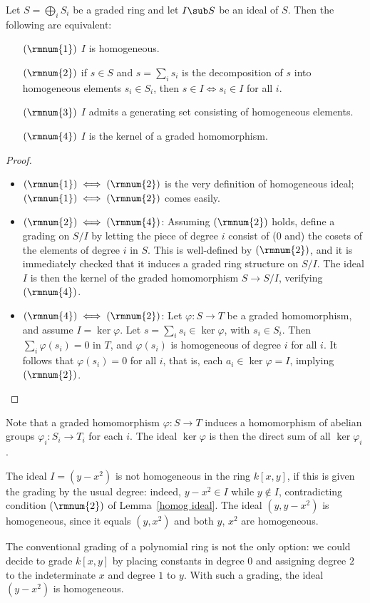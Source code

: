 \begin{lemma}\label{homog ideal}
Let $S=\bigoplus_iS_i$ be a graded ring and let $I\sub S$ be an ideal of $S$. Then the following are equivalent:
\begin{itemize}
\item[$(\rmnum{1})$] $I$ is homogeneous.
\item[$(\rmnum{2})$] if $s\in S$ and $s=\sum_is_i$ is the decomposition of $s$ into homogeneous elements $s_i\in S_i$, then $s\in I\iff s_i\in I$ for all $i$.
\item[$(\rmnum{3})$] $I$ admits a generating set consisting of homogeneous elements.
\item[$(\rmnum{4})$] $I$ is the kernel of a graded homomorphism.
\end{itemize}
\end{lemma}
\begin{proof}
\mbox{}
\begin{itemize}
\item $(\rmnum{1})\iff(\rmnum{2})$ is the very definition of homogeneous ideal; $(\rmnum{1})\iff(\rmnum{2})$ comes easily.
\item $(\rmnum{2})\iff(\rmnum{4})$: Assuming $(\rmnum{2})$ holds, define a grading on $S/I$ by letting the piece of degree $i$ consist of ($0$ and) the cosets of the elements of degree $i$ in $S$. This is well-defined by $(\rmnum{2})$, and it is immediately checked that it induces a graded ring structure on $S/I$. The ideal $I$ is then the kernel of the graded homomorphism $S\to S/I$, verifying $(\rmnum{4})$.
\item $(\rmnum{4})\iff(\rmnum{2})$: Let $\varphi:S\to T$ be a graded homomorphism, and assume $I=\ker\varphi$. Let $s=\sum_is_i\in\ker\varphi$, with $s_i\in S_i$. Then $\sum_i\varphi(s_i)=0$ in $T$, and $\varphi(s_i)$ is homogeneous of degree $i$ for all $i$. It follows that $\varphi(s_i)=0$ for all $i$, that is, each $a_i\in\ker\varphi=I$, implying $(\rmnum{2})$.
\end{itemize}
\end{proof}
Note that a graded homomorphism $\varphi:S\to T$ induces a homomorphism of abelian groups $\varphi_i:S_i\to T_i$ for each $i$. The ideal $\ker\varphi$ is then the direct sum of all $\ker\varphi_i$.
\begin{example}
The ideal $I=(y-x^2)$ is not homogeneous in the ring $k[x,y]$, if this is given the grading by the usual degree: indeed, $y-x^2\in I$ while $y\notin I$, contradicting condition $(\rmnum{2})$ of Lemma~\ref{homog ideal}. The ideal $(y,y-x^2)$ is homogeneous, since it equals $(y,x^2)$ and both $y$, $x^2$ are homogeneous.\par
The conventional grading of a polynomial ring is not the only option: we could decide to grade $k[x,y]$ by placing constants in degree $0$ and assigning degree $2$ to the indeterminate $x$ and degree $1$ to $y$. With such a grading, the ideal $(y-x^2)$ is homogeneous.
\end{example}
